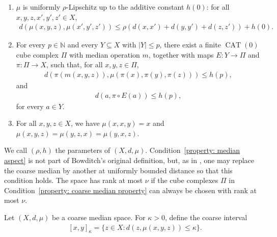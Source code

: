 \documentclass[12pt,reqno]{amsart}
\newcommand{\N}{\mathbb{N}}
\newcommand{\CAT}{\operatorname{CAT}(0)}
\numberwithin{equation}{section}
\begin{document}
\begin{enumerate}
    \item $\mu$ is uniformly $\rho$-Lipschitz up to the additive constant $h(0)$: for all $x,y,z,x',y',z'\in X$,
    \begin{align*}
        d(\mu(x,y,z),\mu(x', y',z'))\le \rho(d(x,x')+d(y, y')+d(z,z'))+h(0).
    \end{align*}
    \item\label{property: coarse median property} For every $p\in\N$ and every $Y\subseteq X$ with $|Y|\le p$, there exist a finite $\CAT$ cube complex $\Pi$ with median operation $m$, together with maps $E:Y\to\Pi$ and $\pi:\Pi\to X$, such that, for all $x,y,z\in\Pi$,
    \begin{align*}
        d\left(\pi(m(x,y,z)), \mu(\pi(x),\pi(y),\pi(z))\right)\le h(p),
    \end{align*}
    and
    \begin{align*}
        d\left(a, \pi\circ E(a)\right)\le h(p),
    \end{align*}
    for every $a\in Y$.
    \item\label{property: median aspect} For all $x,y,z\in X$, we have $\mu(x,x,y)=x$ and $\mu(x,y,z)=\mu(y,z,x)=\mu(y,x,z)$.
\end{enumerate}
We call $(\rho,h)$ the parameters of $(X,d,\mu)$. Condition~\ref{property: median aspect} is not part of Bowditch's original definition, but, as in \cite{Bowditch2014embedding}, one may replace the coarse median by another at uniformly bounded distance so that this condition holds. The space has rank at most $\nu$ if the cube complexes $\Pi$ in Condition~\ref{property: coarse median property} can always be chosen with rank at most $\nu$.

Let $(X,d,\mu)$ be a coarse median space. 
For $\kappa>0$, define the coarse interval
\begin{align*}
    &[x,y]_\kappa=\{z\in X: d(z,\mu(x,y,z))\le \kappa\}.
\end{align*}
\end{document}
